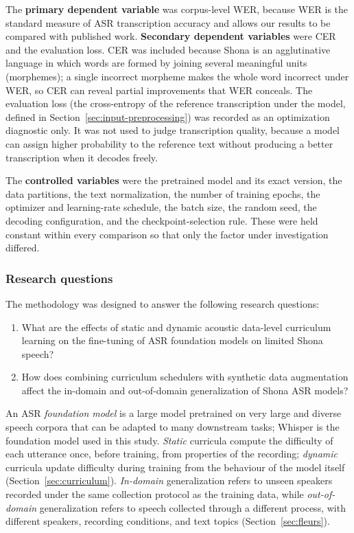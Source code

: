 The \textbf{primary dependent variable} was corpus-level WER, because WER is the
standard measure of ASR transcription accuracy and allows our results to be
compared with published work. \textbf{Secondary dependent variables} were CER and
the evaluation loss. CER was included because Shona is an agglutinative language
in which words are formed by joining several meaningful units (morphemes); a
single incorrect morpheme makes the whole word incorrect under WER, so CER can
reveal partial improvements that WER conceals. The evaluation loss (the
cross-entropy of the reference transcription under the model, defined in
Section~\ref{sec:input-preprocessing}) was recorded as an optimization diagnostic
only. It was not used to judge transcription quality, because a model can assign
higher probability to the reference text without producing a better transcription
when it decodes freely.

The \textbf{controlled variables} were the pretrained model and its exact
version, the data partitions, the text normalization, the number of training
epochs, the optimizer and learning-rate schedule, the batch size, the random seed,
the decoding configuration, and the checkpoint-selection rule. These were held
constant within every comparison so that only the factor under investigation
differed.

\subsubsection{Research questions}

The methodology was designed to answer the following research questions:

\begin{enumerate}
    \item[\textbf{RQ1:}] What are the effects of static and dynamic acoustic
    data-level curriculum learning on the fine-tuning of ASR foundation models
    on limited Shona speech?
    \item[\textbf{RQ2:}] How does combining curriculum schedulers with synthetic
    data augmentation affect the in-domain and out-of-domain generalization of
    Shona ASR models?
\end{enumerate}

An ASR \emph{foundation model} is a large model pretrained on very large and
diverse speech corpora that can be adapted to many downstream tasks; Whisper
\citep{Radford2022} is the foundation model used in this study. \emph{Static}
curricula compute the difficulty of each utterance once, before training, from
properties of the recording; \emph{dynamic} curricula update difficulty during
training from the behaviour of the model itself (Section~\ref{sec:curriculum}).
\emph{In-domain} generalization refers to unseen speakers recorded under the same
collection protocol as the training data, while \emph{out-of-domain}
generalization refers to speech collected through a different process, with
different speakers, recording conditions, and text topics
(Section~\ref{sec:fleurs}).

